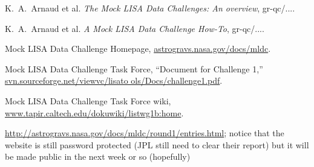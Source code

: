 \documentclass[11pt]{article}
\begin{document}
\begin{thebibliography}{99}

 K.~A.~Arnaud et al. \emph{The Mock LISA Data Challenges: An overview}, gr-qc/....

 K.~A.~Arnaud et al. \emph{A Mock LISA Data Challenge How-To}, gr-qc/....

 Mock LISA Data Challenge Homepage, \url{astrogravs.nasa.gov/docs/mldc}.

 Mock LISA Data Challenge Task Force, ``Document for Challenge 1,'' \url{svn.sourceforge.net/viewvc/lisato
ols/Docs/challenge1.pdf}.

 Mock LISA Data Challenge Task Force wiki, \url{www.tapir.caltech.edu/dokuwiki/listwg1b:home}.

 \url{http://astrogravs.nasa.gov/docs/mldc/round1/entries.html}; notice that the website is still password protected (JPL still need to clear their report) but it will be made public in the next week or so (hopefully)

\end{thebibliography}
\end{document}
